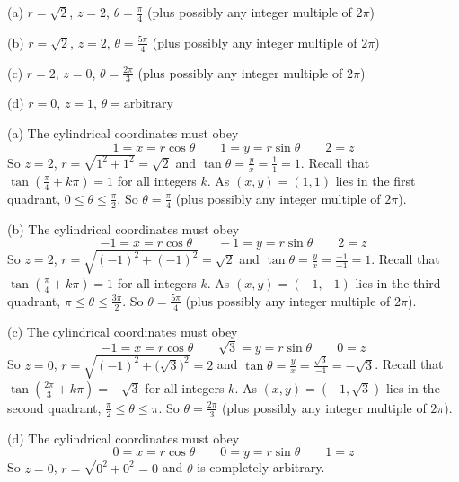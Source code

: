 %

\begin{answer}
(a) $r=\sqrt{2}$, $z=2$, $\theta=\frac{\pi}{4}$ (plus possibly
any integer multiple of $2\pi$)

(b) $r=\sqrt{2}$, $z=2$, $\theta=\frac{5\pi}{4}$ (plus possibly
any integer multiple of $2\pi$)

(c) $r=2$, $z=0$, $\theta=\frac{2\pi}{3}$ (plus possibly
any integer multiple of $2\pi$)

(d) $r=0$, $z=1$, $\theta=\text{arbitrary}$

\end{answer}

\begin{solution}
(a) The cylindrical coordinates must obey
\begin{equation*}
1=x=r\cos\theta\qquad
1=y=r\sin\theta\qquad
2=z
\end{equation*}
So $z=2$, $r=\sqrt{1^2+1^2}=\sqrt{2}$ and $\tan\theta=\frac{y}{x}
=\frac{1}{1}=1$. Recall that $\tan\left(\frac{\pi}{4}+k\pi\right)=1$
for all integers $k$.  As $(x,y)=(1,1)$ lies in the first quadrant,
$0\le\theta\le\frac{\pi}{2}$. So $\theta=\frac{\pi}{4}$ (plus possibly
any integer multiple of $2\pi$). 

(b) The cylindrical coordinates must obey
\begin{equation*}
-1=x=r\cos\theta\qquad
-1=y=r\sin\theta\qquad
2=z
\end{equation*}
So $z=2$, $r=\sqrt{(-1)^2+(-1)^2}=\sqrt{2}$ and $\tan\theta=\frac{y}{x}
=\frac{-1}{-1}=1$. Recall that $\tan\left(\frac{\pi}{4}+k\pi\right)=1$
for all integers $k$. As $(x,y)=(-1,-1)$ lies in the third quadrant,
$\pi\le\theta\le\frac{3\pi}{2}$. So $\theta=\frac{5\pi}{4}$ (plus possibly
any integer multiple of $2\pi$).

(c) The cylindrical coordinates must obey
\begin{equation*}
-1=x=r\cos\theta\qquad
\sqrt{3}=y=r\sin\theta\qquad
0=z
\end{equation*}
So $z=0$, $r=\sqrt{(-1)^2+\big(\sqrt{3}\big)^2}=2$ and 
$\tan\theta=\frac{y}{x} =\frac{\sqrt{3}}{-1}=-\sqrt{3}$. 
Recall that $\tan\left(\frac{2\pi}{3}+k\pi\right)=-\sqrt{3}$
for all integers $k$.
As $(x,y)=(-1,\sqrt{3})$ lies in the second quadrant,
$\frac{\pi}{2}\le\theta\le\pi$. So $\theta=\frac{2\pi}{3}$ (plus possibly
any integer multiple of $2\pi$). 

(d) The cylindrical coordinates must obey
\begin{equation*}
0=x=r\cos\theta\qquad
0=y=r\sin\theta\qquad
1=z
\end{equation*}
So $z=0$, $r=\sqrt{0^2+0^2}=0$ and 
$\theta$ is completely arbitrary. 

\end{solution}


